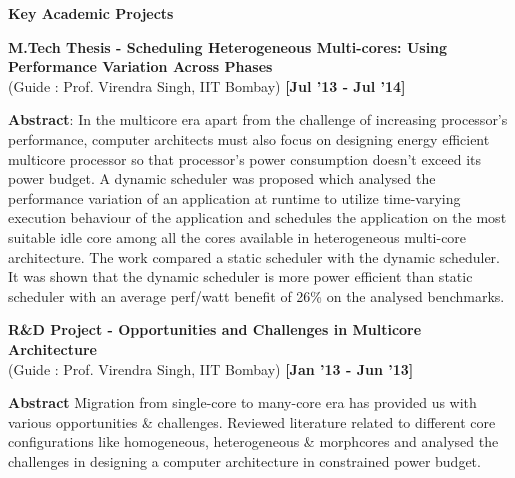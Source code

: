 \documentclass[a4paper,10pt]{article}
\begin{document}
\colorbox{titleColor}{\parbox{6.7in}{\textbf{Key Academic Projects}}}

\begin{itemize*}
  \setlength{\itemsep}{1pt}
  \item \textbf{M.Tech Thesis - Scheduling Heterogeneous Multi-cores: Using Performance Variation Across Phases}  \\
  {(Guide : Prof. Virendra Singh, IIT Bombay)} \hfill {\small{{\textbf{[Jul '13 - Jul '14]}}\/}}
  \begin{itemize*}
    \setlength{\itemsep}{.00pt}
    \item \textbf{Abstract}: In the multicore era apart from the challenge of increasing processor's performance, computer architects must also focus on designing energy efficient multicore processor so that processor's power consumption doesn't exceed its power budget. A dynamic scheduler was proposed which analysed the performance variation of an application at runtime to utilize time-varying execution behaviour of the application and schedules the application on the most suitable idle core among all the cores available in heterogeneous multi-core architecture. The work compared a static scheduler with the dynamic scheduler. It was shown that the dynamic scheduler is more power efficient than static scheduler with an average perf/watt benefit of 26\% on the analysed benchmarks.

  \end{itemize*}
\end{itemize*}

\begin{itemize*}
  \setlength{\itemsep}{1pt}
  \item \textbf{R\&D Project - Opportunities and Challenges in Multicore Architecture} \\
  {(Guide : Prof. Virendra Singh, IIT Bombay)}  \hfill {\small{{\textbf{[Jan '13 - Jun '13]}}\/}}
  \begin{itemize*}

    \setlength{\itemsep}{.00pt}
    \item \textbf{Abstract} Migration from single-core to many-core era has provided us with various opportunities \& challenges. Reviewed literature related to different core configurations like homogeneous, heterogeneous \& morphcores and analysed the challenges in designing a computer architecture in constrained power budget.
  \end{itemize*}
\end{itemize*}
\end{document}
